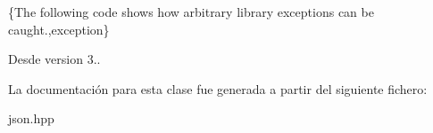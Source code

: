 \{The following code shows how arbitrary library exceptions can be caught.,exception\}

\begin{DoxySince}{Desde}
version 3.. 
\end{DoxySince}


La documentación para esta clase fue generada a partir del siguiente fichero\+:\begin{DoxyCompactItemize}
\item 
json.\+hpp\end{DoxyCompactItemize}
